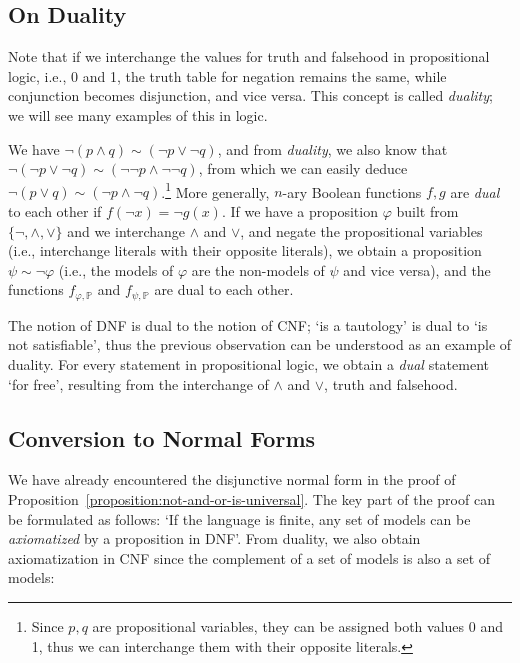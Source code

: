 \subsection{On Duality}

Note that if we interchange the values for truth and falsehood in propositional logic, i.e., 0 and 1, the truth table for negation remains the same, while conjunction becomes disjunction, and vice versa. This concept is called \emph{duality}; we will see many examples of this in logic.

We have $\neg(p \land q) \sim (\neg p \lor \neg q)$, and from \emph{duality}, we also know that $\neg(\neg p \lor \neg q) \sim (\neg \neg p \land \neg \neg q)$, from which we can easily deduce $\neg(p \lor q) \sim (\neg p \land \neg q)$.\footnote{Since $p,q$ are propositional variables, they can be assigned both values 0 and 1, thus we can interchange them with their opposite literals.} More generally, $n$-ary Boolean functions $f, g$ are \emph{dual} to each other if $f(\neg x) = \neg g(x)$. If we have a proposition $\varphi$ built from $\{\neg, \land, \lor\}$ and we interchange $\land$ and $\lor$, and negate the propositional variables (i.e., interchange literals with their opposite literals), we obtain a proposition $\psi \sim \neg \varphi$ (i.e., the models of $\varphi$ are the non-models of $\psi$ and vice versa), and the functions $f_{\varphi, \mathbb P}$ and $f_{\psi, \mathbb P}$ are dual to each other.

The notion of DNF is dual to the notion of CNF; `is a tautology' is dual to `is not satisfiable', thus the previous observation can be understood as an example of duality. For every statement in propositional logic, we obtain a \emph{dual} statement `for free', resulting from the interchange of $\land$ and $\lor$, truth and falsehood.


\subsection{Conversion to Normal Forms}\label{subsection:convert-to-normal-form}

We have already encountered the disjunctive normal form in the proof of Proposition~\ref{proposition:not-and-or-is-universal}. The key part of the proof can be formulated as follows: `If the language is finite, any set of models can be \emph{axiomatized} by a proposition in DNF'. From duality, we also obtain axiomatization in CNF since the complement of a set of models is also a set of models:

